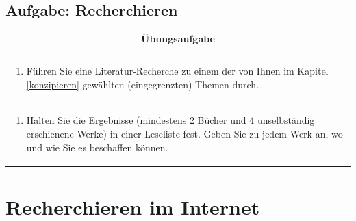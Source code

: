 \documentclass[]{book}
\providecommand{\tightlist}{%
  \setlength{\itemsep}{0pt}\setlength{\parskip}{0pt}}
\theoremstyle{definition}
\theoremstyle{definition}
\theoremstyle{definition}
\theoremstyle{remark}
\begin{document}
\section{Aufgabe: Recherchieren}\label{aufgabe-recherchieren}

\begin{longtable}[]{@{}l@{}}
\caption{\textbf{\label{tab:aufgabe2-test} Übungsaufgabe}}\tabularnewline
\toprule
\begin{minipage}[t]{0.97\columnwidth}\raggedright\strut
\begin{enumerate}
\def\labelenumi{\arabic{enumi}.}
\tightlist
\item
  Führen Sie eine Literatur-Recherche zu einem der von Ihnen im Kapitel
  \ref{konzipieren} gewählten (eingegrenzten) Themen durch.
  \vspace{-6mm}
\end{enumerate}\strut
\end{minipage}\tabularnewline
\begin{minipage}[t]{0.97\columnwidth}\raggedright\strut
\begin{enumerate}
\def\labelenumi{\arabic{enumi}.}
\setcounter{enumi}{1}
\tightlist
\item
  Halten Sie die Ergebnisse (mindestens 2 Bücher und 4 unselbständig
  erschienene Werke) in einer Leseliste fest. Geben Sie zu jedem Werk
  an, wo und wie Sie es beschaffen können.
\end{enumerate}\strut
\end{minipage}\tabularnewline
\bottomrule
\end{longtable}

\hypertarget{recherchieren-im-internet}{\chapter{Recherchieren im
Internet}\label{recherchieren-im-internet}}
\end{document}
